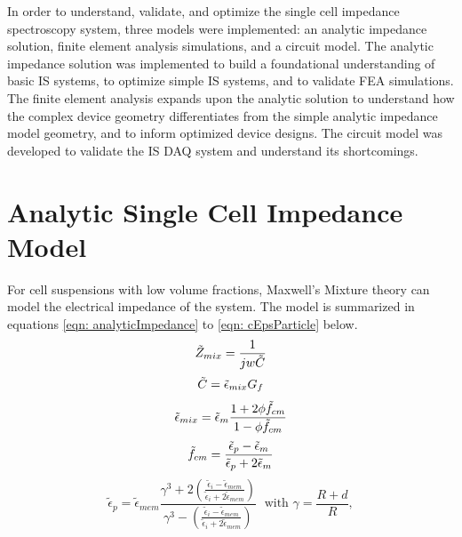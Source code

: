 \label{ch: modeling}

\par In order to understand, validate, and optimize the single cell impedance spectroscopy system, three models were implemented: an analytic impedance solution, finite element analysis simulations, and a circuit model. The analytic impedance solution was implemented to build a foundational understanding of basic IS systems, to optimize simple IS systems, and to validate FEA simulations. The finite element analysis expands upon the analytic solution to understand how the complex device geometry differentiates from the simple analytic impedance model geometry, and to inform optimized device designs. The circuit model was developed to validate the IS DAQ system and understand its shortcomings.

\section{Analytic Single Cell Impedance Model}
\par For cell suspensions with low volume fractions, Maxwell's Mixture theory can model the electrical impedance of the system. The model is summarized in equations \ref{eqn: analyticImpedance} to \ref{eqn: cEpsParticle} below. 
\begin{equation}
    \Tilde{Z}_{mix} = \frac{1}{jw\Tilde{C}}
    \label{eqn: analyticImpedance}
\end{equation}
\begin{equation}
    \Tilde{C} = \Tilde{\epsilon}_{mix}G_f    
\end{equation}
\begin{equation}
    \Tilde{\epsilon}_{mix} = \Tilde{\epsilon}_m \frac{1 + 2\phi\Tilde{f}_{cm}}{1-\phi\Tilde{f}_{cm}}
\end{equation}
\begin{equation}
 \Tilde{f}_{cm} = \frac{\Tilde{\epsilon}_p - \Tilde{\epsilon}_{m}}{\Tilde{\epsilon}_p + 2\Tilde{\epsilon}_m}
\end{equation}
\begin{equation}
      \tilde{\epsilon}_p = \tilde{\epsilon}_{mem} 
      \frac{\gamma^3+2(\frac{\tilde{\epsilon}_i - \tilde{\epsilon}_{mem}}
      {\tilde{\epsilon}_i + 2\tilde{\epsilon}_{mem}})}{\gamma^3 - (\frac{\tilde{\epsilon}_i - \tilde{\epsilon}_{mem}}{\tilde{\epsilon}_i + 2\tilde{\epsilon}_{mem}})} \;\text{  with  } 
      \gamma = \frac{R + d}{R},
      \label{eqn: cEpsParticle}
\end{equation}

